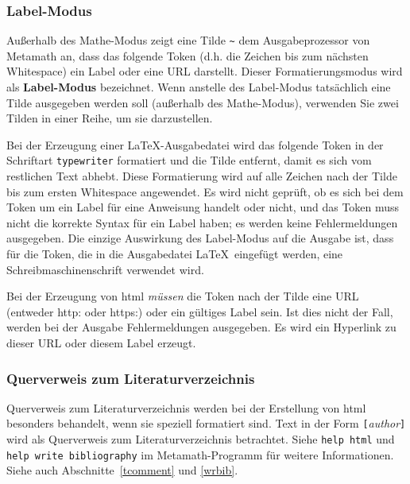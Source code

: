 \subsubsection{Label-Modus}

Außerhalb des Mathe-Modus zeigt eine Tilde \verb/~/ dem Ausgabeprozessor von Metamath an, dass das folgende Token (d.h. die Zeichen bis zum nächsten Whitespace) ein Label oder eine URL darstellt. Dieser Formatierungsmodus wird als {\bf Label-Modus} bezeichnet. Wenn anstelle des Label-Modus tatsächlich eine Tilde ausgegeben werden soll (außerhalb des Mathe-Modus), verwenden Sie zwei Tilden in einer Reihe, um sie darzustellen.

Bei der Erzeugung einer \LaTeX-Ausgabedatei wird das folgende Token in der Schriftart \texttt{typewriter} formatiert und die Tilde entfernt, damit es sich vom restlichen Text abhebt. Diese Formatierung wird auf alle Zeichen nach der Tilde bis zum ersten Whitespace angewendet. Es wird nicht geprüft, ob es sich bei dem Token um ein Label für eine Anweisung handelt oder nicht, und das Token muss nicht die korrekte Syntax für ein Label haben; es werden keine Fehlermeldungen ausgegeben.  Die einzige Auswirkung des Label-Modus auf die Ausgabe ist, dass für die Token, die in die Ausgabedatei \LaTeX\ eingefügt werden, eine Schreibmaschinenschrift verwendet wird.

Bei der Erzeugung von {\sc html} {\em müssen} die Token nach der Tilde eine URL (entweder http: oder https:) oder ein gültiges Label sein. Ist dies nicht der Fall, werden bei der Ausgabe Fehlermeldungen ausgegeben. Es wird ein Hyperlink zu dieser URL oder diesem Label erzeugt.

\subsubsection{Querverweis zum Literaturverzeichnis}%

Querverweis zum Literaturverzeichnis werden bei der Erstellung von {\sc html} besonders behandelt, wenn sie speziell formatiert sind. Text in der Form \texttt{[}{\em author}\texttt{]} wird als Querverweis zum Literaturverzeichnis betrachtet. Siehe \texttt{help html} und \texttt{help write bibliography} im Metamath-Programm für weitere Informationen. 
Siehe auch Abschnitte~\ref{tcomment} und \ref{wrbib}.

